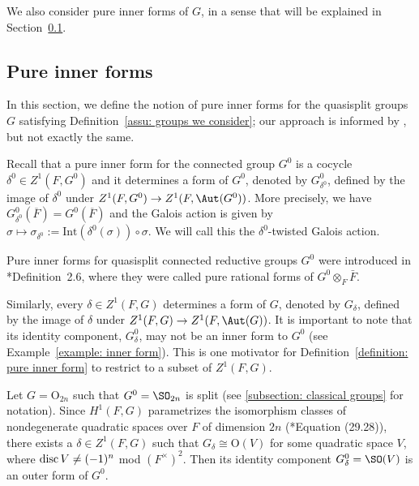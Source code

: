 \documentclass[11pt,letterpaper]{amsart}
\numberwithin{equation}{section}
\begin{document}
We also consider pure inner forms of $G$, in a sense that will be explained in Section~\ref{subsection: pure inner forms}.





\subsection{Pure inner forms}\label{subsection: pure inner forms}


In this section, we define the notion of pure inner forms for the quasisplit groups $G$ satisfying Definition~\ref{assu: groups we consider}; our approach is informed by \cite{Kal26}, but not exactly the same.


Recall that a pure inner form for the connected group $G^0$ is a cocycle $\delta^0\in Z^1(F,G^0)$ and it determines a form of $G^0$, denoted by $G^0_{\delta^0}$, defined by the image of $\delta^0$ under $Z^1(F,G^0) \to Z^1(F,\Aut(G^0))$. More precisely, we have $G^0_{\delta^0}(\overline{F})=G^0(\overline{F})$ and the Galois action is given by $\sigma \mapsto \sigma_{\delta^0}:=\textrm{Int}(\delta^0(\sigma)) \circ \sigma.$ We will call this the $\delta^0$-twisted Galois action.

\begin{remark}
Pure inner forms for quasisplit connected reductive groups $G^0$ were introduced in \cite{Vog93}*{Definition~2.6}, where they were called pure rational forms of $G^0\otimes_{F}{\bar F}$.
\end{remark}


Similarly, every $\delta \in Z^1(F,G)$ determines a form of $G$, denoted by $G_\delta$, defined by the image of $\delta$ under $Z^1(F,G) \to Z^1(F,\Aut(G))$. 
It is important to note that its identity component, $G_\delta^0$, may not be an inner form to $G^0$ (see Example~\ref{example: inner form}). This is  one motivator for Definition~\ref{definition: pure inner form} to restrict to a subset of $Z^1(F,G)$.

\begin{example}
\label{example: inner form}
Let $G = \mathrm{O}_{2n}$ such that $G^0 = \SO_{2n}$ is split (see \ref{subsection: classical groups} for notation). Since $H^1(F, G)$ parametrizes the isomorphism classes of nondegenerate quadratic spaces over $F$ of dimension $2n$ (\cite{KMRT98}*{Equation (29.28)}), there exists a $\delta \in Z^{1}(F, G)$ such that $G_{\delta} \cong \mathrm{O}(V)$ for some quadratic space $V$, where ${\rm disc}\,V \neq (-1)^n$ mod $(F^{\times})^{2}$. Then its identity component $G^0_{\delta} = \SO(V)$ is an outer form of $G^0$.
\end{example}
\end{document}
